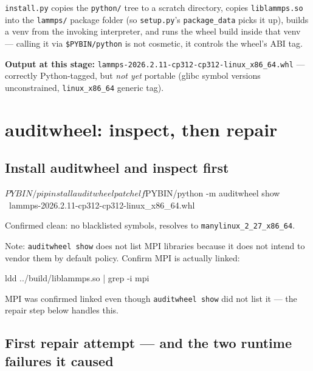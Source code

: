\documentclass[11pt]{article}
\begin{document}
\texttt{install.py} copies the \texttt{python/} tree to a scratch directory,
copies \texttt{liblammps.so} into the \texttt{lammps/} package folder (so
\texttt{setup.py}'s \texttt{package\_data} picks it up), builds a venv from
the invoking interpreter, and runs the wheel build inside that venv --- calling
it via \texttt{\$PYBIN/python} is not cosmetic, it controls the wheel's ABI tag.

\textbf{Output at this stage:}
\texttt{lammps-2026.2.11-cp312-cp312-linux\_x86\_64.whl} --- correctly
Python-tagged, but \emph{not yet} portable (glibc symbol versions
unconstrained, \texttt{linux\_x86\_64} generic tag).

\section{auditwheel: inspect, then repair}
\label{sec:auditwheel}

\subsection{Install auditwheel and inspect first}

\begin{codebox}
$PYBIN/pip install auditwheel patchelf

$PYBIN/python -m auditwheel show \
    lammps-2026.2.11-cp312-cp312-linux_x86_64.whl
\end{codebox}

Confirmed clean: no blacklisted symbols, resolves to
\texttt{manylinux\_2\_27\_x86\_64}.

Note: \texttt{auditwheel show} does not list MPI libraries because it does not
intend to vendor them by default policy.  Confirm MPI is actually linked:

\begin{codebox}
ldd ../build/liblammps.so | grep -i mpi
\end{codebox}

MPI was confirmed linked even though \texttt{auditwheel show} did not list it
--- the repair step below handles this.

\subsection{First repair attempt --- and the two runtime failures it caused}
\end{document}
